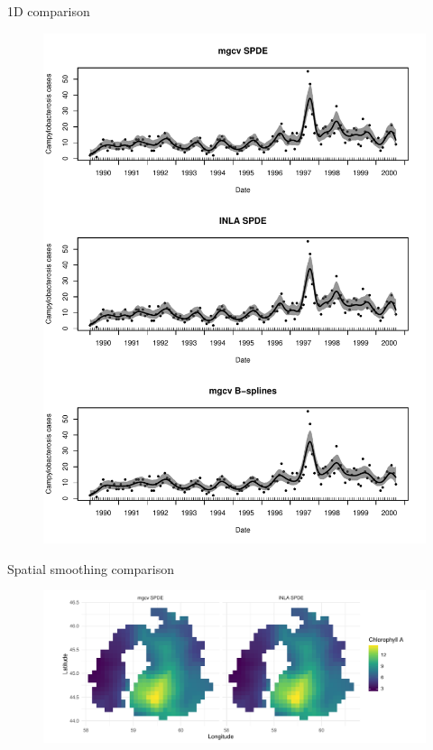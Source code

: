 \documentclass{beamer}
\begin{document}
\begin{frame}{1D comparison}
	\begin{figure}
		\begin{center}
			\includegraphics[height = 0.95\textheight]{figures/campy.pdf}		
		\end{center}
	\end{figure}
\end{frame}


\begin{frame}{Spatial smoothing comparison}
	\begin{figure}
		\begin{center}
			\includegraphics[scale = 0.45]{figures/aral.pdf}		
		\end{center}
	\end{figure}
\end{frame}
\end{document}
